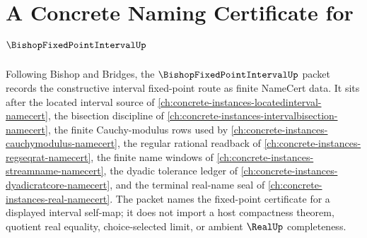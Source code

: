 \chapter{A Concrete Naming Certificate for $\BishopFixedPointIntervalUp$}
\label{ch:concrete-instances-bishop-fixed-point-interval-namecert}

Following Bishop and Bridges, the $\BishopFixedPointIntervalUp$ packet records the constructive interval fixed-point route as finite NameCert data. It sits after the located interval source of \autoref{ch:concrete-instances-locatedinterval-namecert}, the bisection discipline of \autoref{ch:concrete-instances-intervalbisection-namecert}, the finite Cauchy-modulus rows used by \autoref{ch:concrete-instances-cauchymodulus-namecert}, the regular rational readback of \autoref{ch:concrete-instances-regseqrat-namecert}, the finite name windows of \autoref{ch:concrete-instances-streamname-namecert}, the dyadic tolerance ledger of \autoref{ch:concrete-instances-dyadicratcore-namecert}, and the terminal real-name seal of \autoref{ch:concrete-instances-real-namecert}. The packet names the fixed-point certificate for a displayed interval self-map; it does not import a host compactness theorem, quotient real equality, choice-selected limit, or ambient $\RealUp$ completeness.


